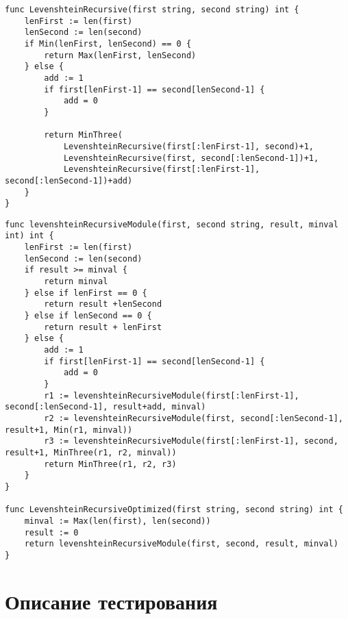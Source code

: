 \begin{lstlisting}
func LevenshteinRecursive(first string, second string) int {
    lenFirst := len(first)
    lenSecond := len(second)
    if Min(lenFirst, lenSecond) == 0 {
        return Max(lenFirst, lenSecond)
    } else {
        add := 1
        if first[lenFirst-1] == second[lenSecond-1] {
            add = 0
        }

        return MinThree(
            LevenshteinRecursive(first[:lenFirst-1], second)+1,
            LevenshteinRecursive(first, second[:lenSecond-1])+1,
            LevenshteinRecursive(first[:lenFirst-1], second[:lenSecond-1])+add)
    }
}
\end{lstlisting}

\begin{lstlisting}
func levenshteinRecursiveModule(first, second string, result, minval int) int {
	lenFirst := len(first)
	lenSecond := len(second)
	if result >= minval {
		return minval
	} else if lenFirst == 0 {
		return result +lenSecond
	} else if lenSecond == 0 {
		return result + lenFirst
	} else {
		add := 1
		if first[lenFirst-1] == second[lenSecond-1] {
			add = 0
		}
		r1 := levenshteinRecursiveModule(first[:lenFirst-1], second[:lenSecond-1], result+add, minval)
		r2 := levenshteinRecursiveModule(first, second[:lenSecond-1], result+1, Min(r1, minval))
		r3 := levenshteinRecursiveModule(first[:lenFirst-1], second, result+1, MinThree(r1, r2, minval))
		return MinThree(r1, r2, r3)
	}
}

func LevenshteinRecursiveOptimized(first string, second string) int {
	minval := Max(len(first), len(second))
	result := 0
	return levenshteinRecursiveModule(first, second, result, minval)
}
\end{lstlisting}

\section{Описание тестирования}


